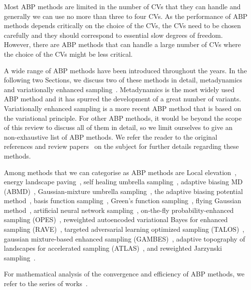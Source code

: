 \documentclass[9pt,review]{livecoms}
\begin{document}
Most ABP methods are limited in the number of CVs that they can handle and generally we can use no more than three to four CVs. As the performance of ABP methods depends critically on the choice of the CVs, the CVs need to be chosen carefully and they should correspond to essential slow degrees of freedom. However, there are ABP methods that can handle a large number of CVs where the choice of the CVs might be less critical.

A wide range of ABP methods have been introduced throughout the years. In the following two Sections, we discuss two of these methods in detail, metadynamics~\cite{Laio-PNAS-2002,Barducci-PRL-2008,Valsson2016_ARPC_MetaD} and variationally enhanced sampling~\cite{Valsson_VES_PRL_2014,Valsson2020Handbook_VES}. Metadynamics is the most widely used ABP method and it has spurred the development of a great number of variants. Variationally enhanced sampling is a more recent ABP method that is based on the variational principle. For other ABP methods, it would be beyond the scope of this review to discuss all of them in detail, so we limit ourselves to give an non-exhaustive list of ABP methods. We refer the reader to the original references and review papers~\cite{Dickson_ABP-Review_2017,Shalini_Review_2019,Allison_Review_2020} on the subject for further details regarding these methods.

Among methods that we can  categorise as ABP methods are
Local elevation~\cite{Huber1994},
energy landscape paving~\cite{Hansmann-PRL-2002},
self healing umbrella sampling~\cite{Marsili2006,Gersende_SelfHealing_2017},
adaptive biasing MD (ABMD)~\cite{Babin2008},
Gaussian-mixture umbrella sampling~\cite{Maragakis-JPCB-2009}, the adaptive biasing potential method~\cite{Dickson2010},
basis function sampling~\cite{Whitmer_BFS_2014}, Green's function sampling~\cite{Whitmer_GFS_2015}, flying Gaussian method~\cite{Sucur2016},
artificial neural network sampling~\cite{Sidky_ANNSampling_2018},
on-the-fly probability-enhanced sampling (OPES)~\cite{Invernizzi2020opus,invernizzi2020unified},
reweighted autoencoded variational Bayes for enhanced sampling (RAVE)~\cite{Tiwary_RAVE_2018},
targeted adversarial learning optimized sampling (TALOS)~\cite{Zhang_TALOS_2019},
gaussian mixture-based enhanced sampling (GAMBES)~\cite{Debnath_GAMBES_2020},
adaptive topography of landscapes for accelerated sampling
(ATLAS)~\cite{giberti2021atlas}, 
and reweighted Jarzynski sampling~\cite{Bal_RewieghtedJarzynski_2021}.

For mathematical analysis of the convergence and efficiency of ABP methods, we refer to the series of works~\cite{fort-jourdain-lelievre-stoltz-18,fort-jourdain-kuhn-lelievre-stoltz-15,fort-jourdain-kuhn-lelievre-stoltz-14,fort-jourdain-lelievre-stoltz-17}.
\end{document}
